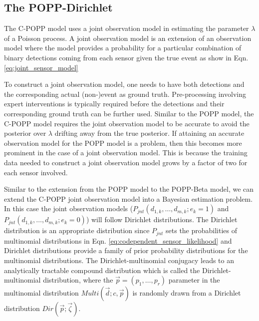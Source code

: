 
\subsection{The POPP-Dirichlet}
\label{subsec:popd}

The C-POPP model uses a joint observation model in estimating the parameter $\lambda$ of a Poisson process. A joint observation model is an extension of an observation model where the model provides a probability for a particular combination of binary detections coming from each sensor given the true event as show in Eqn. \ref{eq:joint_sensor_model}

To construct a joint observation model, one needs to have both detections and the corresponding actual (non-)event as ground truth. Pre-processing involving expert interventions is typically required before the detections and their corresponding ground truth can be further used. Similar to the POPP model, the C-POPP model requires the joint observation model to be accurate to avoid the posterior over $\lambda$ drifting away from the true posterior. If attaining an accurate observation model for the POPP model is a problem, then this becomes more prominent in the case of a joint observation model. This is because the training data needed to construct a joint observation model grows by a factor of two for each sensor involved.       

Similar to the extension from the POPP model to the POPP-Beta model, we can extend the C-POPP joint observation model into a Bayesian estimation problem. In this case the joint observation models ($P_{jnt}(d_{1,k}, \ldots, d_{m,k} ; e_k = 1)$ and $P_{jnt}(d_{1,k}, \ldots, d_{m,k} ; e_k = 0)$) will follow Dirichlet distributions. The Dirichlet distribution is an appropriate distribution since $P_{jnt}$ sets the probabilities of multinomial distributions in Eqn. \ref{eq:codependent_sensor_likelihood} and Dirichlet distributions provide a family of prior probability distributions for the multinomial distributions. The Dirichlet-multinomial conjugacy leads to an analytically tractable compound distribution which is called the Dirichlet-multinomial distribution, where the $\vec{p} = (p_1, \ldots, p_r)$ parameter in the multinomial distribution $Multi(\vec{d} ; c, \vec{p})$ is randomly drawn from a Dirichlet distribution $Dir(\vec{p} ; \vec{\zeta})$. 

